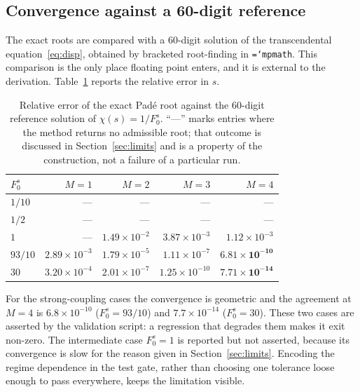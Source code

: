 \documentclass[11pt,a4paper]{article}
\newcommand{\Fzs}{F_0^{s}}
\newcommand{\code}[1]{\texttt{\hyphenchar\font=`\-\relax #1}}
\begin{document}
\subsection{Convergence against a 60-digit reference}

The exact roots are compared with a $60$-digit solution of the transcendental
equation~\eqref{eq:disp}, obtained by bracketed root-finding in \code{mpmath}.
This comparison is the only place floating point enters, and it is external to
the derivation. Table~\ref{tab:conv} reports the relative error in
$s$.

\begin{table}[htbp]
\centering
\caption{Relative error of the exact Pad\'e root against the $60$-digit
reference solution of $\chi(s)=1/\Fzs$. ``---'' marks entries where the method
returns no admissible root; that outcome is discussed in
Section~\ref{sec:limits} and is a property of the construction, not a failure of
a particular run.}
\label{tab:conv}
\begin{tabular}{lrrrr}
\toprule
$\Fzs$ & $M=1$ & $M=2$ & $M=3$ & $M=4$ \\
\midrule
$1/10$  & ---                   & ---                   & ---                   & --- \\
$1/2$   & ---                   & ---                   & ---                   & --- \\
$1$     & ---                   & $1.49\times10^{-2}$   & $3.87\times10^{-3}$   & $1.12\times10^{-3}$ \\
$93/10$ & $2.89\times10^{-3}$   & $1.79\times10^{-5}$   & $1.11\times10^{-7}$   & $\mathbf{6.81\times10^{-10}}$ \\
$30$    & $3.20\times10^{-4}$   & $2.01\times10^{-7}$   & $1.25\times10^{-10}$  & $\mathbf{7.71\times10^{-14}}$ \\
\bottomrule
\end{tabular}
\end{table}

For the strong-coupling cases the convergence is geometric and the agreement at
$M=4$ is $6.8\times10^{-10}$ ($\Fzs = 93/10$) and $7.7\times10^{-14}$
($\Fzs=30$). These two cases are asserted by the validation script: a
regression that degrades them makes it exit non-zero. The intermediate case
$\Fzs=1$ is reported but not asserted, because its convergence is slow for the
reason given in Section~\ref{sec:limits}. Encoding the regime dependence in the
test gate, rather than choosing one tolerance loose enough to pass everywhere,
keeps the limitation visible.
\end{document}
